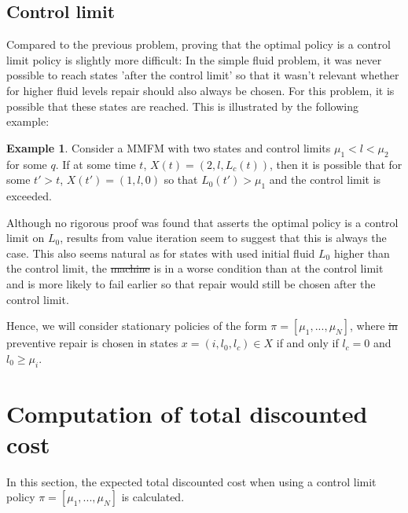 \documentclass[a4paper]{thesis}
\theoremstyle{definition}
\newtheorem{example}{Example}[chapter]
\providecommand{\DIFaddtex}[1]{{\protect\color{blue}\uwave{#1}}} %
\providecommand{\DIFdeltex}[1]{{\protect\color{red}\sout{#1}}}                      %
\providecommand{\DIFaddbegin}{} %
\providecommand{\DIFaddend}{} %
\providecommand{\DIFdelbegin}{} %
\providecommand{\DIFdelend}{} %
\providecommand{\DIFadd}[1]{\texorpdfstring{\DIFaddtex{#1}}{#1}} %
\providecommand{\DIFdel}[1]{\texorpdfstring{\DIFdeltex{#1}}{}} %
\newcommand{\DIFscaledelfig}{0.5}
\newlength{\DIFdelgraphicswidth} %
\newlength{\DIFdelgraphicsheight} %
\newcommand{\DIFaddincludegraphics}[2][]{{\color{blue}\fbox{\DIFOincludegraphics[#1]{#2}}}} %
\newcommand{\DIFdelincludegraphics}[2][]{%
	\sbox{\DIFdelgraphicsbox}{\DIFOincludegraphics[#1]{#2}}%
	\settoboxwidth{\DIFdelgraphicswidth}{\DIFdelgraphicsbox} %
	\settoboxtotalheight{\DIFdelgraphicsheight}{\DIFdelgraphicsbox} %
	\scalebox{\DIFscaledelfig}{%
		\parbox[b]{\DIFdelgraphicswidth}{\usebox{\DIFdelgraphicsbox}\\[-\baselineskip] \rule{\DIFdelgraphicswidth}{0em}}\llap{\resizebox{\DIFdelgraphicswidth}{\DIFdelgraphicsheight}{%
				\setlength{\unitlength}{\DIFdelgraphicswidth}%
				\begin{picture}(1,1)%
				\thicklines\linethickness{2pt} %
				{\color[rgb]{1,0,0}\put(0,0){\framebox(1,1){}}}%
				{\color[rgb]{1,0,0}\put(0,0){\line( 1,1){1}}}%
				{\color[rgb]{1,0,0}\put(0,1){\line(1,-1){1}}}%
				\end{picture}%
			}\hspace*{3pt}}} %
} %
\DeclareRobustCommand{\DIFaddbegin}{\DIFOaddbegin \let\includegraphics\DIFaddincludegraphics} %
\DeclareRobustCommand{\DIFaddend}{\DIFOaddend \let\includegraphics\DIFOincludegraphics} %
\DeclareRobustCommand{\DIFdelbegin}{\DIFOdelbegin \let\includegraphics\DIFdelincludegraphics} %
\DeclareRobustCommand{\DIFdelend}{\DIFOaddend \let\includegraphics\DIFOincludegraphics} %
\begin{document}
	\subsection{Control limit}
	Compared to the previous problem, proving that the optimal policy is a control limit policy is slightly more difficult:
	In the simple fluid problem, it was never possible to reach states 'after the control limit' so that it wasn't relevant whether for higher fluid levels repair should also always be chosen.
	For this problem, it is possible that these states are reached.
	This is illustrated by the following example:
	\begin{example}
		Consider a MMFM with two states and control limits $\mu_1<l<\mu_2$ for some $q$.
		If at some time $t$, $X(t)=(2,l,L_c(t))$, then it is possible that for some $t'>t$, $X(t')=(1,l,0)$ so that $L_0(t')>\mu_1$ and the control limit is exceeded.
	\end{example}
	Although no rigorous proof was found that asserts the optimal policy is a control limit on $L_0$, results from value iteration seem to suggest that this is always the case.
	This also seems natural as for states with used initial fluid $L_0$ higher than the control limit, the \DIFdelbegin \DIFdel{machine }\DIFdelend \DIFaddbegin \DIFadd{asset }\DIFaddend is in a worse condition than at the control limit and is more likely to fail earlier so that repair would still be chosen after the control limit.
	
	Hence, we will consider stationary policies of the form $\pi=[\mu_1,...,\mu_N]$, where \DIFdelbegin \DIFdel{in }\DIFdelend preventive repair is chosen in states $x=(i,l_0,l_c)\in X$ if and only if $l_c=0$ and $l_0\geq \mu_i$. \section{Computation of total discounted cost}
	In this section, the expected total discounted cost when using a control limit policy $\pi=[\mu_1,...,\mu_N]$ is calculated.
	
\end{document}
